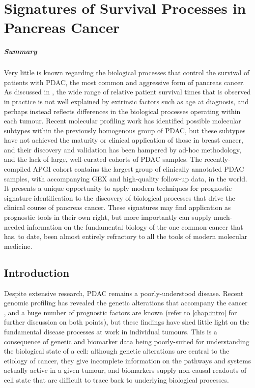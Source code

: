 \documentclass[dissertation.tex]{subfiles}
\begin{document}
\chapter{Signatures of Survival Processes in Pancreas Cancer}
\label{chap:signatures}

\paragraph{Summary}Very little is known regarding the biological processes that control the survival of patients with \gls{PDAC}, the most common and aggressive form of pancreas cancer.  As discussed in , the wide range of relative patient survival times that is observed in practice is not well explained by extrinsic factors such as age at diagnosis, and perhaps instead reflects differences in the biological processes operating within each tumour.  Recent molecular profiling work \cite{Collisson2011} has identified possible molecular subtypes within the previously homogenous group of \gls{PDAC}, but these subtypes have not achieved the maturity or clinical application of those in breast cancer, and their discovery and validation has been hampered by ad-hoc methodology, and the lack of large, well-curated cohorts of \gls{PDAC} samples.  The recently-compiled \gls{APGI} cohort contains the largest group of clinically annotated \gls{PDAC} samples, with accompanying \gls{GEX} and high-quality follow-up data, in the world.  It presents a unique opportunity to apply modern techniques for prognostic signature identification to the discovery of biological processes that drive the clinical course of pancreas cancer.  These signatures may find application as prognostic tools in their own right, but more importantly can supply much-needed information on the fundamental biology of the one common cancer that has, to date, been almost entirely refractory to all the tools of modern molecular medicine.


\section{Introduction}

Despite extensive research, \gls{PDAC} remains a poorly-understood disease.  Recent genomic profiling has revealed the genetic alterations that accompany the cancer \cite{Biankin2012}, and a huge number of prognostic factors are known \cite{Harsha2009} (refer to \cref{chap:intro} for further discussion on both points), but these findings have shed little light on the fundamental disease processes at work in individual tumours.  This is a consequence of genetic and biomarker data being poorly-suited for understanding the biological state of a cell: although genetic alterations are central to the etiology of cancer, they give incomplete information on the pathways and systems actually active in a given tumour, and biomarkers supply non-causal readouts of cell state that are difficult to trace back to underlying biological processes.
\end{document}
